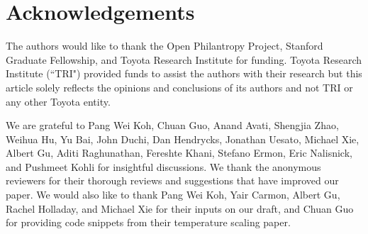 \section{Acknowledgements}

The authors would like to thank the Open Philantropy Project, Stanford Graduate Fellowship, and Toyota Research Institute for funding. Toyota Research Institute (``TRI") provided funds to assist the authors with their research but this article solely reflects the opinions and conclusions of its authors and not TRI or any other Toyota entity.

We are grateful to Pang Wei Koh, Chuan Guo, Anand Avati, Shengjia Zhao, Weihua Hu, Yu Bai, John Duchi, Dan Hendrycks, Jonathan Uesato, Michael Xie, Albert Gu, Aditi Raghunathan, Fereshte Khani, Stefano Ermon, Eric Nalisnick, and Pushmeet Kohli for insightful discussions. We thank the anonymous reviewers for their thorough reviews and suggestions that have improved our paper. We would also like to thank Pang Wei Koh, Yair Carmon, Albert Gu, Rachel Holladay, and Michael Xie for their inputs on our draft, and Chuan Guo for providing code snippets from their temperature scaling paper.

\newpage





